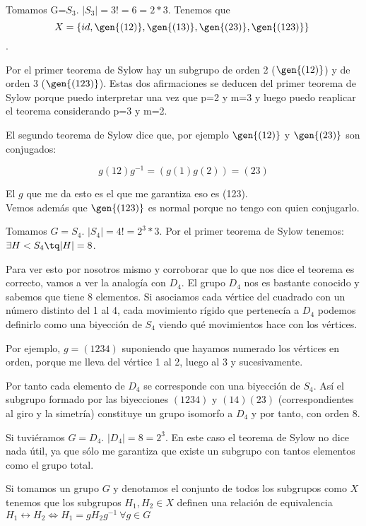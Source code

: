\documentclass[nochap]{apuntes}
\begin{document}
\begin{example} Tomamos G=$S_3$. $|S_3|=3!=6=2*3$. Tenemos que \[ X=\{id, \gen{(12)}, \gen{(13)},\gen{(23)},\gen{(123)}\} \].

 Por el primer teorema de Sylow hay un subgrupo de orden 2 ($\gen{(12)}$) y de orden 3 ($\gen{(123)}$). Estas dos afirmaciones se deducen del primer teorema de Sylow porque puedo interpretar una vez que p=2 y m=3 y luego puedo reaplicar
 el teorema considerando p=3 y m=2.
 
 El segundo teorema de Sylow dice que, por ejemplo $\gen{(12)}$ y $\gen{(23)}$ son conjugados:
 
 \[g(12)g^{-1}=(g(1)g(2))=(23)\]
 
 El $g$ que me da esto es el que me garantiza eso es (123).\\
 Vemos además que $\gen{(123)}$ es normal porque no tengo con quien conjugarlo.
\end{example}

\begin{example}
 Tomamos $G=S_4$. $|S_4|=4!=2^3*3$. Por el primer teorema de Sylow tenemos: $\exists H < S_4 \tq |H|=8$.
 
 Para ver esto por nosotros mismo y corroborar que lo que nos dice el teorema es correcto, vamos a ver la analogía con $D_4$. El grupo $D_4$ nos es bastante conocido y sabemos que tiene 8 elementos. Si asociamos cada vértice del cuadrado con un número distinto
 del 1 al 4, cada movimiento rígido que pertenecía a $D_4$  podemos definirlo como una biyección de $S_4$  viendo qué movimientos hace
 con los vértices.
 
 Por ejemplo, $g=(1234)$ suponiendo que hayamos numerado los vértices en orden, porque me lleva del vértice 1 al 2, luego al 3 y sucesivamente.
 
 Por tanto cada elemento de $D_4$ se corresponde con una biyección de $S_4$. Así el subgrupo formado por las biyecciones $(1234)$ y $(14)(23)$ (correspondientes al giro y la simetría) constituye un grupo isomorfo a $D_4$ y por tanto, con orden 8.
\end{example}

\begin{example}
 Si tuviéramos $G=D_4$. $|D_4|=8=2^3$. En este caso el teorema de Sylow no dice nada útil, ya que sólo me garantiza que existe un subgrupo con tantos elementos como el grupo total.
\end{example}

Si tomamos un grupo $G$ y denotamos el conjunto de todos los subgrupos como $X$ tenemos que los subgrupos $H_1, H_2 \in X$ definen una relación de equivalencia $H_1\rel H_2 \iff H_1 = gH_2g^{-1} \ \forall g\in G$
\end{document}
